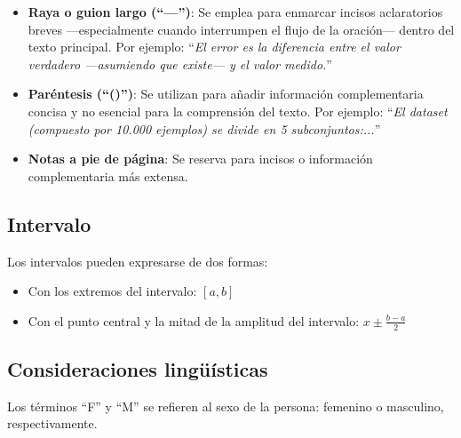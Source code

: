 \begin{itemize}
    \item \textbf{Raya o guion largo (``---'')}: Se emplea para enmarcar incisos aclaratorios breves
    ---especialmente cuando interrumpen el flujo de la oración--- dentro del texto principal.
    Por ejemplo: ``\textit{El error es la diferencia entre el valor verdadero ---asumiendo que existe--- y el 
    valor medido.}''

    \item \textbf{Paréntesis (``()'')}: Se utilizan para añadir información complementaria concisa y no 
    esencial para la comprensión del texto.
    Por ejemplo: ``\textit{El dataset (compuesto por 10.000 ejemplos) se divide en 5 subconjuntos:...}''

    \item \textbf{Notas a pie de página}: Se reserva para incisos o información complementaria más extensa.
    
\end{itemize}


\subsection*{Intervalo}

Los intervalos pueden expresarse de dos formas:

\begin{itemize}
    \item Con los extremos del intervalo: $[a,b]$
    \item Con el punto central y la mitad de la amplitud del intervalo: $x \pm \frac{b-a}{2}$
\end{itemize}


\subsection*{Consideraciones lingüísticas}

Los términos ``F'' y ``M'' se refieren al sexo de la persona: femenino o masculino, respectivamente. 
